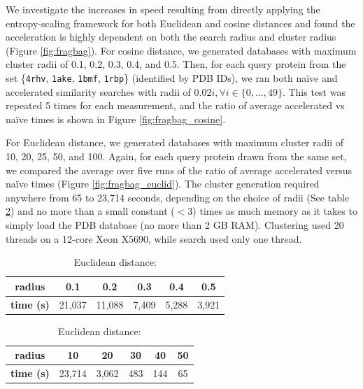 \documentclass[review,preprint,12pt]{elsarticle}
\theoremstyle{definition}
\theoremstyle{remark}
\numberwithin{equation}{section}
\begin{document}
We investigate the increases in speed resulting from directly applying the entropy-scaling framework for both Euclidean and cosine distances and found the acceleration is highly dependent on both the search radius and cluster radius (Figure \ref{fig:fragbag}).
For cosine distance, we generated databases with maximum cluster radii of 0.1, 0.2, 0.3, 0.4, and 0.5.
Then, for each query protein from the set \{\texttt{4rhv}, \texttt{1ake}, \texttt{1bmf}, \texttt{1rbp}\} (identified by PDB IDs), we ran both na\"ive and accelerated similarity searches with radii of $0.02i, \forall i \in \{0,\ldots,49\}$.
This test was repeated 5 times for each measurement, and the ratio of average accelerated vs na\"ive times is shown in Figure \ref{fig:fragbag_cosine}.

For Euclidean distance, we generated databases with maximum cluster radii of 10, 20, 25, 50, and 100.
Again, for each query protein drawn from the same set, we compared the average over five runs of the ratio of average accelerated versus na\"ive times (Figure \ref{fig:fragbag_euclid}).
The cluster generation required anywhere from 65 to 23,714 seconds, depending on the choice of radii (See table \ref{tab:esfragbag_clustering}) and no more than a small constant ($<3$) times as much memory as it takes to simply load the PDB database (no more than 2 GB RAM).
Clustering used 20 threads on a 12-core Xeon X5690, while search used only one thread.
\begin{table}
\caption{Cluster generation time for esFragBag}
\label{tab:esfragbag_clustering}
\begin{subtable}{1\textwidth}
    \centering
\caption{Cosine distance:}
\begin{tabular}{c|ccccc}
\hline
\textbf{radius} & 0.1 & 0.2 & 0.3 & 0.4 &  0.5 \\
\hline
\textbf{time (s)} & 21,037 & 11,088 & 7,409 & 5,288 & 3,921 \\
\hline
\end{tabular}
\end{subtable}

\vspace{1em}
\begin{subtable}{1\textwidth}
    \centering
\caption{Euclidean distance:}
\begin{tabular}{c|ccccc}
\hline
\textbf{radius} & 10 & 20 & 30 & 40 & 50 \\
\hline
\textbf{time (s)} & 23,714 & 3,062 & 483 & 144 & 65 \\
\hline
\end{tabular}
\end{subtable}
\end{table}
\end{document}
